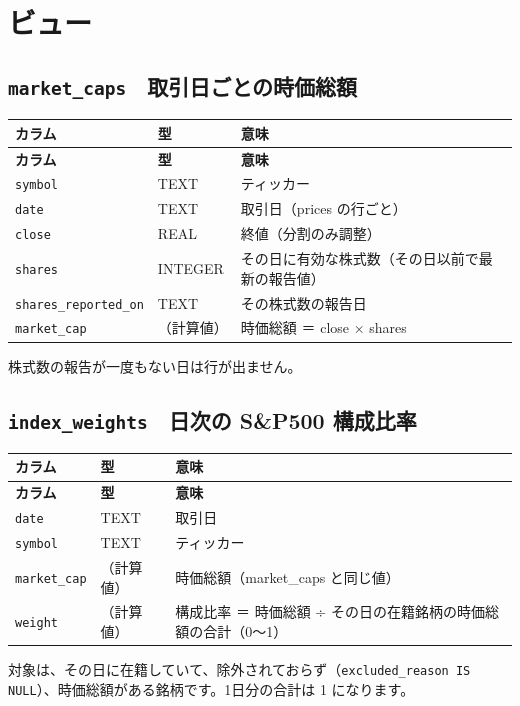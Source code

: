 \documentclass[xelatex,ja=standard,jafont=hiragino-pron,a4paper,10pt]{bxjsreport}
\begin{document}
\section{ビュー}

\subsection*{\texttt{market\_\allowbreak{}caps}　取引日ごとの時価総額}
{\footnotesize
\begin{longtable}{p{3.60cm}p{1.80cm}p{8.90cm}}
\toprule
\textbf{カラム} & \textbf{型} & \textbf{意味} \\
\midrule
\endfirsthead
\toprule
\textbf{カラム} & \textbf{型} & \textbf{意味} \\
\midrule
\endhead
\bottomrule
\endfoot
\texttt{symbol} & TEXT & ティッカー \\
\texttt{date} & TEXT & 取引日（prices の行ごと） \\
\texttt{close} & REAL & 終値（分割のみ調整） \\
\texttt{shares} & INTEGER & その日に有効な株式数（その日以前で最新の報告値） \\
\texttt{shares\_\allowbreak{}reported\_\allowbreak{}on} & TEXT & その株式数の報告日 \\
\texttt{market\_\allowbreak{}cap} & （計算値） & 時価総額 ＝ close × shares \\
\end{longtable}
}
{\small 株式数の報告が一度もない日は行が出ません。\par}
\medskip
\subsection*{\texttt{index\_\allowbreak{}weights}　日次の S\&P500 構成比率}
{\footnotesize
\begin{longtable}{p{3.60cm}p{1.80cm}p{8.90cm}}
\toprule
\textbf{カラム} & \textbf{型} & \textbf{意味} \\
\midrule
\endfirsthead
\toprule
\textbf{カラム} & \textbf{型} & \textbf{意味} \\
\midrule
\endhead
\bottomrule
\endfoot
\texttt{date} & TEXT & 取引日 \\
\texttt{symbol} & TEXT & ティッカー \\
\texttt{market\_\allowbreak{}cap} & （計算値） & 時価総額（market\_caps と同じ値） \\
\texttt{weight} & （計算値） & 構成比率 ＝ 時価総額 ÷ その日の在籍銘柄の時価総額の合計（0〜1） \\
\end{longtable}
}
{\small 対象は、その日に在籍していて、除外されておらず（\texttt{excluded\_\allowbreak{}reason IS NULL}）、時価総額がある銘柄です。1日分の合計は 1 になります。\par}
\medskip
\end{document}
